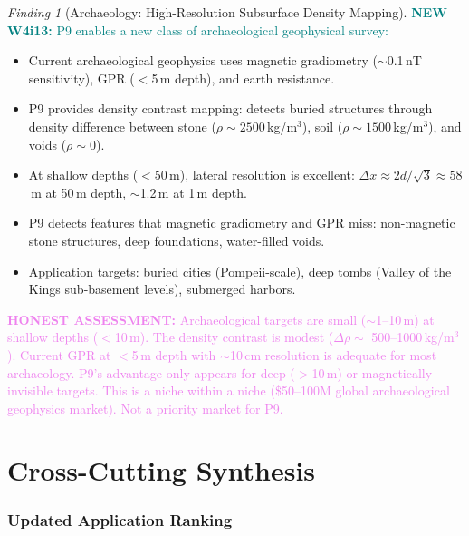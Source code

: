 \documentclass[11pt]{article}
\theoremstyle{definition}
\theoremstyle{remark}
\newtheorem{finding}[theorem]{Finding}
\newcommand{\drho}{\Delta\rho}
\newcommand{\honest}[1]{\textcolor{violet}{\textbf{HONEST ASSESSMENT:} #1}}
\newcommand{\newfinding}[1]{\textcolor{teal}{\textbf{NEW W4i13:} #1}}
\begin{document}
\begin{finding}[Archaeology: High-Resolution Subsurface Density Mapping]
\label{find:archaeology}
\newfinding{P9 enables a new class of archaeological geophysical survey:}
\begin{itemize}[nosep]
\item Current archaeological geophysics uses magnetic gradiometry
  ($\sim$0.1\,nT sensitivity), GPR ($<$5\,m depth), and earth resistance.
\item P9 provides density contrast mapping: detects buried structures
  through density difference between stone ($\rho \sim 2500$\,kg/m$^3$),
  soil ($\rho \sim 1500$\,kg/m$^3$), and voids ($\rho \sim 0$).
\item At shallow depths ($<$50\,m), lateral resolution is excellent:
  $\Delta x \approx 2d/\sqrt{3} \approx 58$\,m at 50\,m depth,
  $\sim$1.2\,m at 1\,m depth.
\item P9 detects features that magnetic gradiometry and GPR miss:
  non-magnetic stone structures, deep foundations, water-filled voids.
\item Application targets: buried cities (Pompeii-scale), deep tombs
  (Valley of the Kings sub-basement levels), submerged harbors.
\end{itemize}

\honest{Archaeological targets are small ($\sim$1--10\,m) at shallow
depths ($<$10\,m). The density contrast is modest ($\drho \sim$
500--1000\,kg/m$^3$). Current GPR at $<$5\,m depth with $\sim$10\,cm
resolution is adequate for most archaeology. P9's advantage only
appears for deep ($>$10\,m) or magnetically invisible targets. This
is a niche within a niche (\$50--100M global archaeological
geophysics market). Not a priority market for P9.}
\end{finding}

\part{Cross-Cutting Synthesis}
\label{part:synthesis}

\section{Updated Application Ranking}
\label{sec:ranking}
\end{document}
